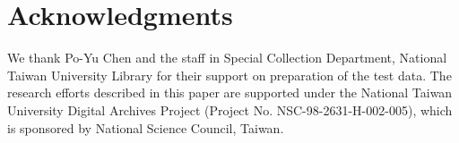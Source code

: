 \section*{Acknowledgments}


We thank Po-Yu Chen and the staff in Special Collection Department, National
Taiwan University Library for their support on preparation of the test data.
The research efforts described in this paper are supported under the National
Taiwan University Digital Archives Project (Project No.
NSC-98-2631-H-002-005), which is sponsored by National Science Council, Taiwan. 
